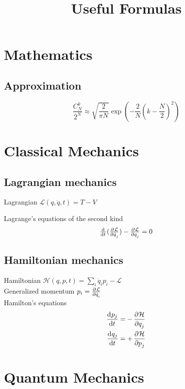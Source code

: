 \documentclass{article}
\begin{document}
\title{Useful Formulas}
\maketitle

\section{Mathematics}
\subsection{Approximation}
\begin{equation}
	\frac{C_N^k}{2^N}\approx\sqrt{\frac{2}{\pi N}}\exp(-\frac{2}{N}(k-\frac{N}{2})^2)
\end{equation}

\section{Classical Mechanics}
\subsection{Lagrangian mechanics}
Lagrangian $\mathcal{L}(q,\dot q, t) = T - V$\par
Lagrange's equations of the second kind
\begin{equation}
\label{eq:LagrangeEquation}
\od{}{t}(\pd{\mathcal{L}}{\dot q_j})-\pd{\mathcal{L}}{q_j}=0
\end{equation}

\subsection{Hamiltonian mechanics}
Hamiltonian $\mathcal{H}(q, p, t)=\sum_{i}\dot q_i p_i - \mathcal{L}$\\
Generalized momentum $p_i = \pd{\mathcal{L}}{\dot q_i}$\\
Hamilton's equations
\begin{subequations}
\begin{align}
\dod{p_j}{t}&=-\dpd{\mathcal H}{q_j}\\
\dod{q_j}{t}&=+\dpd{\mathcal H}{p_j}
\end{align}
\end{subequations}

\section{Quantum Mechanics}
\end{document}
